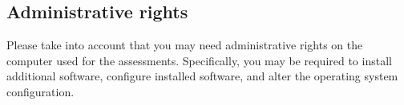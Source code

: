 \subsection{Administrative rights}

Please take into account that you may need administrative rights on
the computer used for the assessments. Specifically, you may be
required to install additional software, configure installed software,
and alter the operating system configuration.
